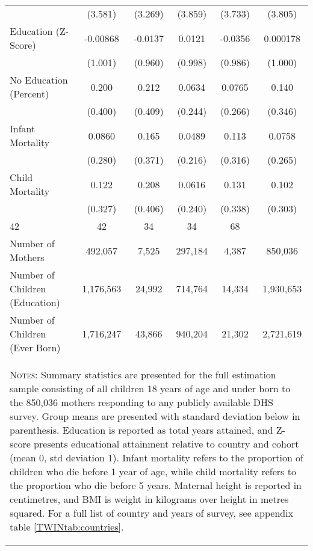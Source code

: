 \begin{table}[htpb!]
\begin{center}
{\begin{tabular}{lccccc}
&(3.581)&(3.269)&(3.859)&(3.733)&(3.805)\\
Education (Z-Score)&-0.00868&-0.0137&0.0121&-0.0356&0.000178\\
&(1.001)&(0.960)&(0.998)&(0.986)&(1.000)\\
No Education (Percent)&0.200&0.212&0.0634&0.0765&0.140\\
&(0.400)&(0.409)&(0.244)&(0.266)&(0.346)\\
Infant Mortality&0.0860&0.165&0.0489&0.113&0.0758\\
&(0.280)&(0.371)&(0.216)&(0.316)&(0.265)\\
Child Mortality&0.122&0.208&0.0616&0.131&0.102\\
&(0.327)&(0.406)&(0.240)&(0.338)&(0.303)\\
\midrule
42&42&34&34&68 \\
Number of Mothers &492,057 &7,525 &297,184 &4,387 & 850,036 \\
Number of Children (Education) &1,176,563 &24,992 &714,764 &14,334 & 1,930,653 \\
Number of Children (Ever Born) &1,716,247 &43,866 &940,204 &21,302 & 2,721,619 \\
\midrule
\multicolumn{6}{p{13.8cm}}{\begin{footnotesize}\textsc{Notes:} Summary statistics are presented for the full estimation  sample consisting of all children 18 years of age and under born to the 850,036 mothers responding to any publicly available DHS survey. Group means are presented with standard deviation below in parenthesis.  Education is reported as total years attained, and Z-score presents educational attainment relative to country and cohort (mean 0, std deviation 1).  Infant mortality refers to the proportion of children who die before 1 year of age,  while child mortality refers to the proportion who die before 5 years.  Maternal height is reported in centimetres, and BMI is weight in kilograms over height in metres squared.  For a full list of country and years of survey, see appendix table \ref{TWINtab:countries}.\end{footnotesize}} \\ \bottomrule \end{tabular}}\end{center}\end{table}